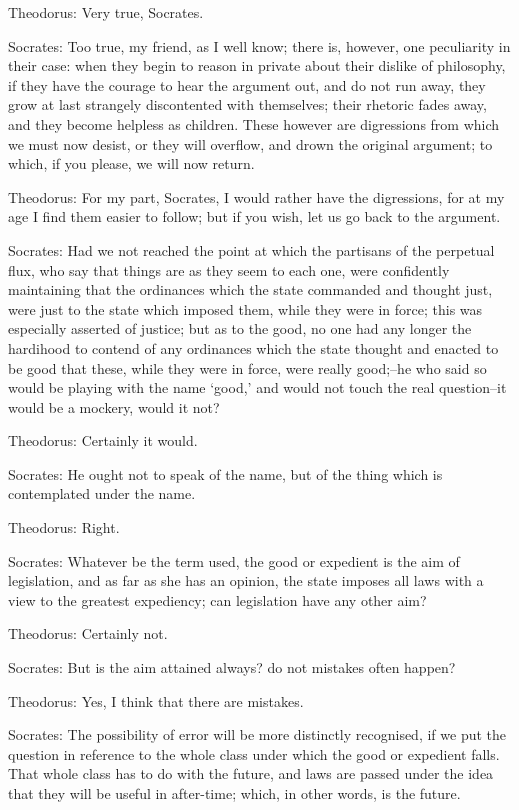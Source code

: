 Theodorus: Very true, Socrates.

Socrates: Too true, my friend, as I well know; there is, however, one
peculiarity in their case: when they begin to reason in private about
their dislike of philosophy, if they have the courage to hear the
argument out, and do not run away, they grow at last strangely
discontented with themselves; their rhetoric fades away, and they become
helpless as children. These however are digressions from which we must
now desist, or they will overflow, and drown the original argument; to
which, if you please, we will now return.

Theodorus: For my part, Socrates, I would rather have the digressions,
for at my age I find them easier to follow; but if you wish, let us go
back to the argument.

Socrates: Had we not reached the point at which the partisans of the
perpetual flux, who say that things are as they seem to each one, were
confidently maintaining that the ordinances which the state commanded
and thought just, were just to the state which imposed them, while they
were in force; this was especially asserted of justice; but as to the
good, no one had any longer the hardihood to contend of any ordinances
which the state thought and enacted to be good that these, while they
were in force, were really good;--he who said so would be playing with
the name `good,' and would not touch the real question--it would be a
mockery, would it not?

Theodorus: Certainly it would.

Socrates: He ought not to speak of the name, but of the thing which is
contemplated under the name.

Theodorus: Right.

Socrates: Whatever be the term used, the good or expedient is the aim
of legislation, and as far as she has an opinion, the state imposes all
laws with a view to the greatest expediency; can legislation have any
other aim?

Theodorus: Certainly not.

Socrates: But is the aim attained always? do not mistakes often happen?

Theodorus: Yes, I think that there are mistakes.

Socrates: The possibility of error will be more distinctly recognised,
if we put the question in reference to the whole class under which the
good or expedient falls. That whole class has to do with the future, and
laws are passed under the idea that they will be useful in after-time;
which, in other words, is the future.

